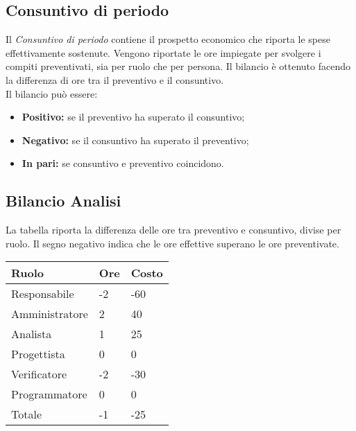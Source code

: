 \begin{flushleft}
    \chapter{Consuntivo di periodo}
    Il \textit{Consuntivo di periodo} contiene il prospetto economico che riporta le spese effettivamente sostenute. Vengono riportate le ore impiegate per svolgere i compiti preventivati, sia per
    ruolo che per persona. Il bilancio è ottenuto facendo la differenza di ore tra il preventivo e il consuntivo.\\
    Il bilancio può essere:
    \begin{itemize}
        \item \textbf{Positivo:} se il preventivo ha superato il consuntivo;
        \item \textbf{Negativo:} se il consuntivo ha superato il preventivo;
        \item \textbf{In pari:} se consuntivo e preventivo coincidono.
    \end{itemize}
    \section{Bilancio Analisi}
    La tabella riporta la differenza delle ore tra preventivo e consuntivo, divise per ruolo. Il segno negativo indica che le ore effettive superano le ore preventivate.    
    \begin{table}[h]
        \begin{tabular}{|l|l|l|}
        \hline
        Ruolo          & Ore & Costo \\ \hline
        Responsabile   & -2  & -60   \\ \hline
        Amministratore & 2   & 40    \\ \hline
        Analista       & 1   & 25    \\ \hline
        Progettista    & 0   & 0     \\ \hline
        Verificatore   & -2  & -30   \\ \hline
        Programmatore  & 0   & 0     \\ \hline
        Totale         & -1   & -25   \\ \hline
        \end{tabular}
    \end{table}\\


\end{flushleft}
